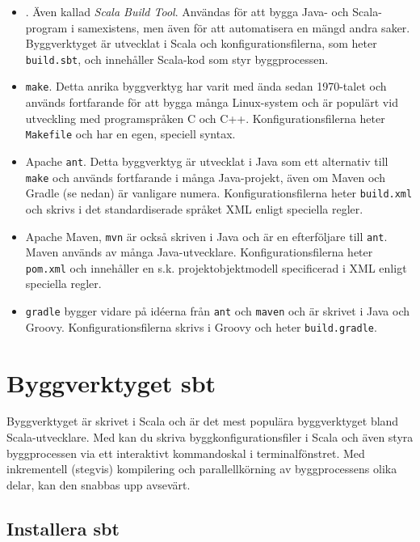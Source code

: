 \begin{itemize}
\item \sbt. Även kallad \textit{Scala Build Tool}. Användas för att bygga Java- och Scala-program i samexistens, men även för att automatisera en mängd andra saker. Byggverktyget är utvecklat i Scala och konfigurationsfilerna, som heter \texttt{build.sbt}, och innehåller Scala-kod som styr byggprocessen. 

\item \texttt{make}. Detta anrika byggverktyg har varit med ända sedan 1970-talet och används fortfarande för att bygga många Linux-system och är populärt vid utveckling med programspråken C och C++. Konfigurationsfilerna heter \texttt{Makefile} och har en egen, speciell syntax.

\item Apache \texttt{ant}. Detta byggverktyg är utvecklat i Java som ett alternativ till \texttt{make} och används fortfarande i många Java-projekt, även om Maven och Gradle (se nedan) är vanligare numera. Konfigurationsfilerna heter \texttt{build.xml} och skrivs i det standardiserade språket XML enligt  speciella regler.

\item Apache Maven, \texttt{mvn} är också skriven i Java och är en efterföljare till \texttt{ant}. Maven används av många Java-utvecklare. Konfigurationsfilerna heter \texttt{pom.xml} och innehåller en s.k. projektobjektmodell specificerad i XML enligt  speciella regler.

\item \texttt{gradle} bygger vidare på idéerna från \texttt{ant} och \texttt{maven} och är skrivet i Java och Groovy.  Konfigurationsfilerna skrivs i Groovy och heter \texttt{build.gradle}.  

\end{itemize} 

\section{Byggverktyget sbt}

Byggverktyget \sbt är skrivet i Scala och är det mest populära byggverktyget bland Scala-utvecklare. Med \sbt kan du skriva byggkonfigurationsfiler i Scala och även styra byggprocessen via ett interaktivt kommandoskal i terminalfönstret. Med inkrementell (stegvis) kompilering och parallellkörning av byggprocessens olika delar, kan den snabbas upp avsevärt.    


\subsection{Installera sbt}

